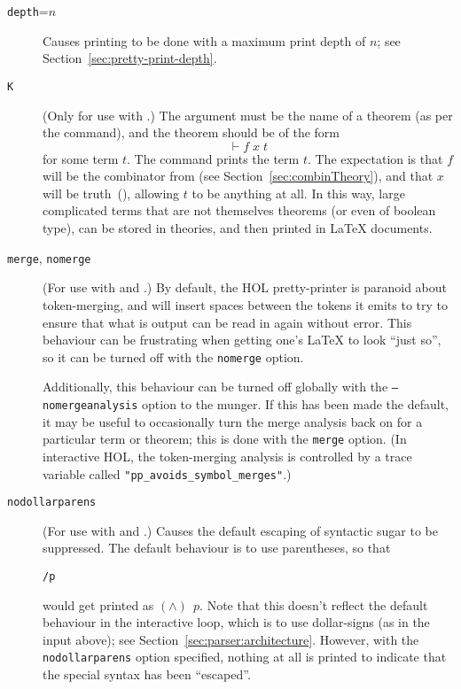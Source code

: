 \begin{description}
\item[\texttt{depth}=$n$]
Causes printing to be done with a maximum print depth of $n$; see Section~\ref{sec:pretty-print-depth}.

\item[\texttt{K}] (Only for use with \holtm.)
%
The argument must be the name of a theorem (as per the \holthm{} command), and the theorem should be of the form
\[
\vdash f\;x\;t
\]
for some term $t$.
%
The command prints the term $t$.
%
%
%
The expectation is that $f$ will be the combinator  from  (see Section~\ref{sec:combinTheory}), and that $x$ will be truth~(), allowing $t$ to be anything at all.
%
In this way, large complicated terms that are not themselves theorems (or even of boolean type), can be stored in \HOL{} theories, and then printed in \LaTeX{} documents.

\item[\texttt{merge}, \texttt{nomerge}] (For use with \holtm{} and \holthm.)
By default, the HOL pretty-printer is paranoid about token-merging, and will insert spaces between the tokens it emits to try to ensure that what is output can be read in again without error.
%
This behaviour can be frustrating when getting one's \LaTeX{} to look ``just so'', so it can be turned off with the \texttt{nomerge} option.

Additionally, this behaviour can be turned off globally with the \texttt{--nomergeanalysis} option to the munger.
%
If this has been made the default, it may be useful to occasionally turn the merge analysis back on for a particular term or theorem; this is done with the \texttt{merge} option.
%
(In interactive HOL, the token-merging analysis is controlled by a trace variable called \texttt{"pp\_avoids\_symbol\_merges"}.)


\item[\texttt{nodollarparens}] (For use with \holtm{} and \holthm.) Causes the default escaping of syntactic sugar to be suppressed.
%
%
The default behaviour is to use parentheses, so that
\begin{alltt}
   \holtm\lb\dol/\bs p\rb
\end{alltt}
would get printed as $(\land)\;\,p$.
Note that this doesn't reflect the default behaviour in the interactive loop, which is to use dollar-signs (as in the input above); see Section~\ref{sec:parser:architecture}.
However, with the \texttt{nodollarparens} option specified, nothing at all is printed to indicate that the special syntax has been ``escaped''.


\end{description}
